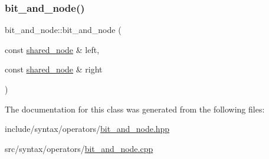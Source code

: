 \subsubsection{\texorpdfstring{bit\+\_\+and\+\_\+node()}{bit\_and\_node()}}
{\footnotesize\ttfamily bit\+\_\+and\+\_\+node\+::bit\+\_\+and\+\_\+node (\begin{DoxyParamCaption}\item[{const \hyperlink{namespacejawe_a3f307481d921b6cbb50cc8511fc2b544}{shared\+\_\+node} \&}]{left,  }\item[{const \hyperlink{namespacejawe_a3f307481d921b6cbb50cc8511fc2b544}{shared\+\_\+node} \&}]{right }\end{DoxyParamCaption})}



The documentation for this class was generated from the following files\+:\begin{DoxyCompactItemize}
\item 
include/syntax/operators/\hyperlink{bit__and__node_8hpp}{bit\+\_\+and\+\_\+node.\+hpp}\item 
src/syntax/operators/\hyperlink{bit__and__node_8cpp}{bit\+\_\+and\+\_\+node.\+cpp}\end{DoxyCompactItemize}
